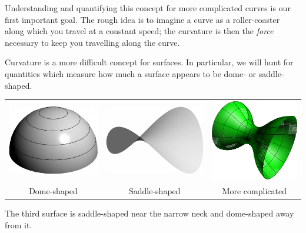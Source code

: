 Understanding and quantifying this concept for more complicated curves is our first important goal. The rough idea is to imagine a curve as a roller-coaster along which you travel at a constant speed; the curvature is then the \emph{force} necessary to keep you travelling along the curve.\smallbreak

Curvature is a more difficult concept for surfaces. In particular, we will hunt for quantities which measure how much a surface appears to be dome- or saddle-shaped.
\begin{center}
	\begin{tabular}{c@{\qquad\qquad}c@{\qquad\qquad}c}
		\includegraphics[scale=0.9]{intro-dome} & \includegraphics{intro-saddle} & \includegraphics{intro-saddle-dome} \\[5pt]
		Dome-shaped & Saddle-shaped & More complicated
	\end{tabular}
\end{center}
The third surface is saddle-shaped near the narrow neck and dome-shaped away from it.


